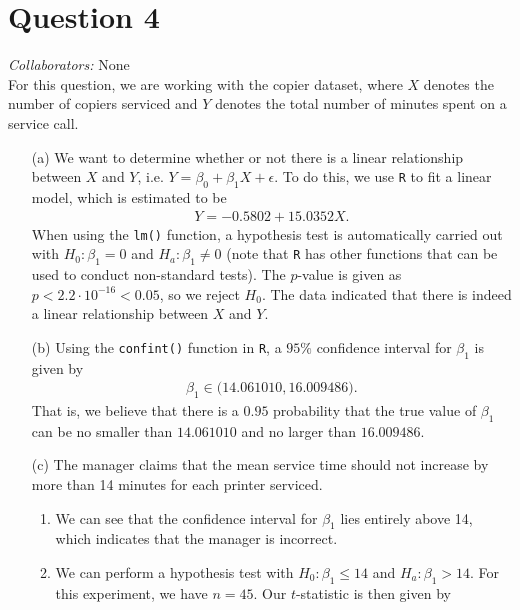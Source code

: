 \documentclass[10pt]{article}
\newcommand{\mycolab}[1]{\textcolor{colabcol}{\textsl{Collaborators:}} #1\\}
\begin{document}
\section{Question 4} \noindent
\mycolab{None}
For this question, we are working with the copier dataset, where \(X\) denotes the number of copiers serviced and \(Y\) denotes the total number of 
minutes spent on a service call. 
\begin{itemize}
    \item[(a)] We want to determine whether or not there is a linear relationship between \(X\) and \(Y\), i.e. \(Y = \beta_0 + \beta_1 X + \epsilon\). 
    To do this, we use \texttt{R} to fit a linear model, which is estimated to be 
    \begin{align*}
        Y = -0.5802 + 15.0352 X.
    \end{align*}
    When using the \texttt{lm()} function, a hypothesis test is automatically carried out with 
    \(H_0 : \beta_1 = 0\) and \(H_a : \beta_1 \neq 0\) (note that \texttt{R} has other functions that can be used to conduct non-standard tests). 
    The \(p\)-value is given as \(p < 2.2 \cdot 10^{-16} < 0.05\), so we reject \(H_0\). The data indicated that there is indeed 
    a linear relationship between \(X\) and \(Y\).
    \item[(b)] Using the \texttt{confint()} function in \texttt{R}, a \(95\%{}\) confidence interval for \(\beta_1\) is given by 
    \begin{align*}
        \beta_1 \in \big(14.061010, 16.009486\big).
    \end{align*}
    That is, we believe that there is a \(0.95\) probability that the true value of \(\beta_1\) can be no smaller than \(14.061010\) and no larger
    than \(16.009486\).
    \item[(c)] The manager claims that the mean service time should not increase by more than 14 minutes for each printer serviced. 
    \begin{enumerate}
        \item We can see that the confidence interval for \(\beta_1\) lies entirely above 14, which indicates that the manager is incorrect. 
        \item We can perform a hypothesis test with \(H_0 : \beta_1 \le 14\) and \(H_a : \beta_1 > 14\). For this experiment, we have \(n = 45\). 
        Our \(t\)-statistic is then given by 

\end{enumerate}
\end{itemize}
\end{document}
